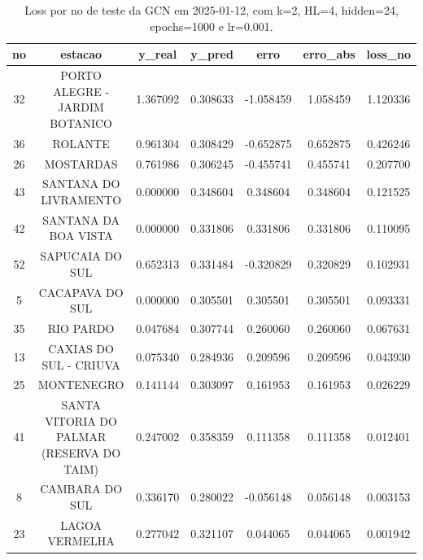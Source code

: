 \begin{table}[h]
\centering
\caption{Loss por no de teste da GCN em 2025-01-12, com k=2, HL=4, hidden=24, epochs=1000 e lr=0.001.}
\label{tab:gcn_loss_k2_hl4_h24_e1000_d20250112}
\begin{tabular}{ccccccc}
\toprule
no & estacao & y\_real & y\_pred & erro & erro\_abs & loss\_no \\
\midrule
32 & PORTO ALEGRE - JARDIM BOTANICO & 1.367092 & 0.308633 & -1.058459 & 1.058459 & 1.120336 \\
36 & ROLANTE & 0.961304 & 0.308429 & -0.652875 & 0.652875 & 0.426246 \\
26 & MOSTARDAS & 0.761986 & 0.306245 & -0.455741 & 0.455741 & 0.207700 \\
43 & SANTANA DO LIVRAMENTO & 0.000000 & 0.348604 & 0.348604 & 0.348604 & 0.121525 \\
42 & SANTANA DA BOA VISTA & 0.000000 & 0.331806 & 0.331806 & 0.331806 & 0.110095 \\
52 & SAPUCAIA DO SUL & 0.652313 & 0.331484 & -0.320829 & 0.320829 & 0.102931 \\
5 & CACAPAVA DO SUL & 0.000000 & 0.305501 & 0.305501 & 0.305501 & 0.093331 \\
35 & RIO PARDO & 0.047684 & 0.307744 & 0.260060 & 0.260060 & 0.067631 \\
13 & CAXIAS DO SUL - CRIUVA & 0.075340 & 0.284936 & 0.209596 & 0.209596 & 0.043930 \\
25 & MONTENEGRO & 0.141144 & 0.303097 & 0.161953 & 0.161953 & 0.026229 \\
41 & SANTA VITORIA DO PALMAR (RESERVA DO TAIM) & 0.247002 & 0.358359 & 0.111358 & 0.111358 & 0.012401 \\
8 & CAMBARA DO SUL & 0.336170 & 0.280022 & -0.056148 & 0.056148 & 0.003153 \\
23 & LAGOA VERMELHA & 0.277042 & 0.321107 & 0.044065 & 0.044065 & 0.001942 \\
\bottomrule
\end{tabular}
\end{table}
